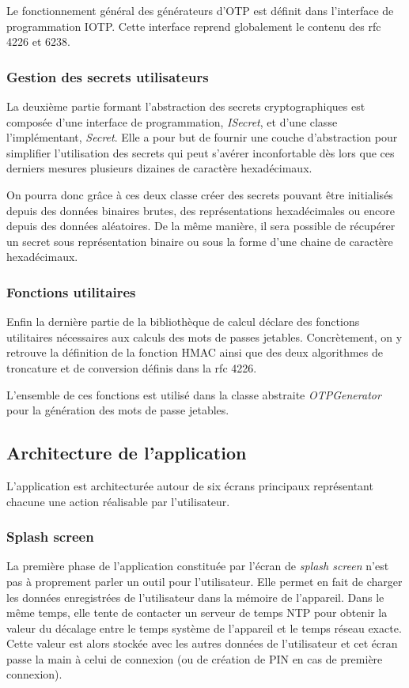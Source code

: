Le fonctionnement général des générateurs d'OTP est définit dans l'interface de
programmation IOTP. Cette interface reprend globalement le contenu des rfc 4226 et 6238.

\subsubsection{Gestion des secrets utilisateurs}
La deuxième partie formant l'abstraction des secrets cryptographiques est composée d'une
interface de programmation, \emph{ISecret}, et d'une classe l'implémentant, \emph{Secret}.
Elle a pour but de fournir une couche d'abstraction pour simplifier l'utilisation des secrets
qui peut s'avérer inconfortable dès lors que ces derniers mesures plusieurs dizaines de
caractère hexadécimaux.

On pourra donc grâce à ces deux classe créer des secrets pouvant être initialisés depuis des
données binaires brutes, des représentations hexadécimales ou encore depuis des données
aléatoires. De la même manière, il sera possible de récupérer un secret sous représentation
binaire ou sous la forme d'une chaine de caractère hexadécimaux.

\subsubsection{Fonctions utilitaires}
Enfin la dernière partie de la bibliothèque de calcul déclare des fonctions utilitaires
nécessaires aux calculs des mots de passes jetables. Concrètement, on y retrouve la
définition de la fonction HMAC\cite{HMACrfc} ainsi que des deux algorithmes de troncature et
de conversion définis dans la rfc 4226.

L'ensemble de ces fonctions est utilisé dans la classe abstraite \emph{OTPGenerator} pour la
génération des mots de passe jetables.

\subsection{Architecture de l'application}

L'application est architecturée autour de six écrans principaux représentant chacune une 
action réalisable par l'utilisateur. 

\subsubsection{Splash screen}
La première phase de l'application constituée par l'écran de \emph{splash screen} n'est pas à 
proprement parler un outil pour l'utilisateur. Elle permet en fait de charger les données enregistrées
de l'utilisateur dans la mémoire de l'appareil. Dans le même temps, elle tente de contacter un serveur
de temps NTP pour obtenir la valeur du décalage entre le temps système de l'appareil et le temps réseau
exacte. Cette valeur est alors stockée avec les autres données de l'utilisateur et cet écran passe la
main à celui de connexion (ou de création de PIN en cas de première connexion).

